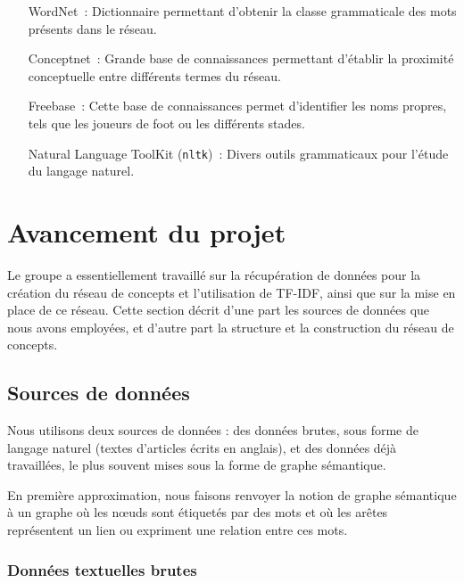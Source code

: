 \documentclass[a4paper, 12pt]{article}
\newcommand{\pyt}[1]{\texttt{#1}}%
\begin{document}
\begin{itemize}
	\item[WordNet~: ]Dictionnaire permettant d'obtenir la classe grammaticale des mots présents dans le réseau.
	\item[Conceptnet~: ]Grande base de connaissances permettant d'établir la proximité conceptuelle entre différents termes du réseau.
	\item[Freebase~: ]Cette base de connaissances permet d'identifier les noms propres, tels que les joueurs de foot ou les différents stades.
	\item[Natural Language ToolKit (\pyt{nltk})~: ]Divers outils grammaticaux pour l'étude du langage naturel.
\end{itemize}



\section{Avancement du projet}

Le groupe a essentiellement travaillé sur la récupération de données pour la création du réseau de concepts et l'utilisation de TF-IDF, ainsi que sur la mise en place de ce réseau. Cette section décrit d'une part les sources de données que nous avons employées, et d'autre part la structure et la construction du réseau de concepts.

\subsection{Sources de données}

Nous utilisons deux sources de données : des données brutes, sous forme de langage naturel (textes d'articles écrits en anglais), et des données déjà travaillées, le plus souvent mises sous la forme de graphe sémantique.

\begin{definition}
En première approximation, nous faisons renvoyer la notion de graphe sémantique à un graphe où les nœuds sont étiquetés par des mots et où les arêtes représentent un lien ou expriment une relation entre ces mots.
\end{definition}


\subsubsection{Données textuelles brutes}
\end{document}

